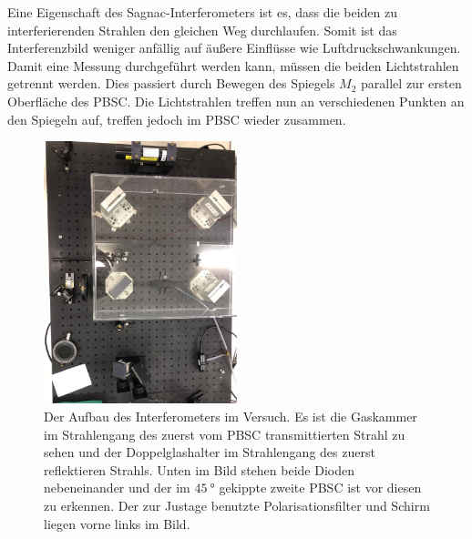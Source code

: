 
\noindent Eine Eigenschaft des Sagnac-Interferometers ist es, dass die beiden zu interferierenden Strahlen den gleichen Weg durchlaufen. Somit ist das Interferenzbild weniger 
anfällig auf äußere Einflüsse wie Luftdruckschwankungen. Damit eine Messung durchgeführt werden kann, müssen die beiden Lichtstrahlen getrennt werden. Dies passiert durch Bewegen 
des Spiegels $M_2$ parallel zur ersten Oberfläche des PBSC. Die Lichtstrahlen treffen nun an verschiedenen Punkten an den Spiegeln auf, treffen jedoch im PBSC wieder zusammen. 

\begin{figure}[H]
    \centering
    \includegraphics[width=0.5\textwidth]{bilder/interfer_foto.png}
    \caption{Der Aufbau des Interferometers im Versuch. Es ist die Gaskammer im Strahlengang des zuerst vom PBSC transmittierten Strahl zu sehen und der Doppelglashalter im Strahlengang 
    des zuerst reflektieren Strahls. Unten im Bild stehen beide Dioden nebeneinander und der im $\SI{45}{\degree}$ gekippte zweite PBSC ist vor diesen zu erkennen. Der zur Justage benutzte 
    Polarisationsfilter und Schirm liegen vorne links im Bild.}
    \label{fig:Interferob}   
\end{figure}


